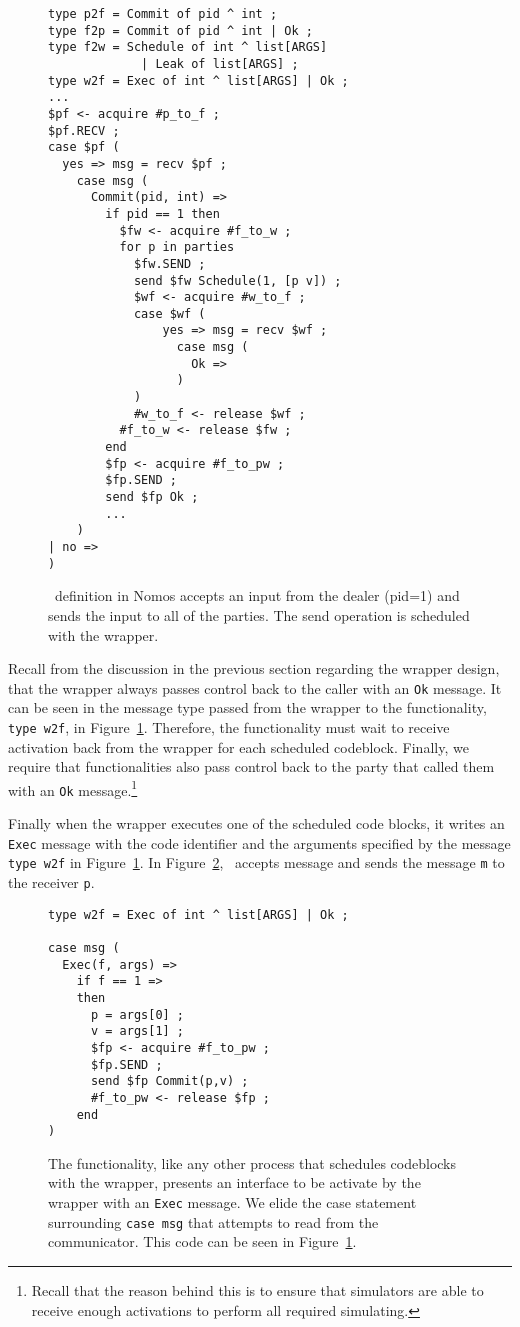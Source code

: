 \begin{figure}
\begin{lstlisting}[basicstyle=\small\ttfamily, frame=single]
type p2f = Commit of pid ^ int ;
type f2p = Commit of pid ^ int | Ok ;
type f2w = Schedule of int ^ list[ARGS] 
             | Leak of list[ARGS] ;
type w2f = Exec of int ^ list[ARGS] | Ok ;
...
$pf <- acquire #p_to_f ;
$pf.RECV ;
case $pf (
  yes => msg = recv $pf ;
    case msg (
      Commit(pid, int) => 
        if pid == 1 then
          $fw <- acquire #f_to_w ;
    	  for p in parties
    	    $fw.SEND ;
    	    send $fw Schedule(1, [p v]) ;
    	    $wf <- acquire #w_to_f ;
    	    case $wf (
    	    	yes => msg = recv $wf ;
    	  	      case msg (
    	  	        Ok =>
    	  	      )
    	    )
    	    #w_to_f <- release $wf ;
    	  #f_to_w <- release $fw ;
    	end
    	$fp <- acquire #f_to_pw ;
    	$fp.SEND ;
    	send $fp Ok ;
    	...
    )
| no =>
)
\end{lstlisting}
\caption{\Frbc~definition in Nomos accepts an input from the dealer (pid=1) and \Eventually sends the input to all of the parties. The send operation is scheduled with the wrapper.}
\label{fig:nomos:frbc}
\end{figure}

Recall from the discussion in the previous section regarding the wrapper design, that the wrapper always passes control back to the caller with an \texttt{Ok} message.
It can be seen in the message type passed from the wrapper to the functionality, \texttt{type w2f}, in Figure~\ref{fig:nomos:frbc}.
Therefore, the functionality must wait to receive activation back from the wrapper for each scheduled codeblock.
Finally, we require that functionalities also pass control back to the party that called them with an \texttt{Ok} message.\footnote{Recall that the reason behind this is to ensure that simulators are able to receive enough activations to perform all required simulating.}

Finally when the wrapper executes one of the scheduled code blocks, it writes an \texttt{Exec} message with the code identifier and the arguments specified by the message \texttt{type w2f} in Figure~\ref{fig:nomos:frbc}.
In Figure~\ref{fig:nomos:frbcexec}, \Frbc~accepts \Exec message and sends the message \texttt{m} to the receiver \texttt{p}.

\begin{figure}
\begin{lstlisting}[basicstyle=\small\ttfamily, frame=single]
type w2f = Exec of int ^ list[ARGS] | Ok ; 

case msg (
  Exec(f, args) =>
    if f == 1 =>
	then
	  p = args[0] ;
	  v = args[1] ;
	  $fp <- acquire #f_to_pw ;
	  $fp.SEND ;
	  send $fp Commit(p,v) ;
	  #f_to_pw <- release $fp ;
	end
)
\end{lstlisting}
\caption{The functionality, like any other process that schedules codeblocks with the wrapper, presents an interface to be activate by the wrapper with an \texttt{Exec} message. We elide the case statement surrounding \texttt{case msg} that attempts to read from the communicator. This code can be seen in Figure~\ref{fig:nomos:frbc}.}
\label{fig:nomos:frbcexec}
\end{figure}

